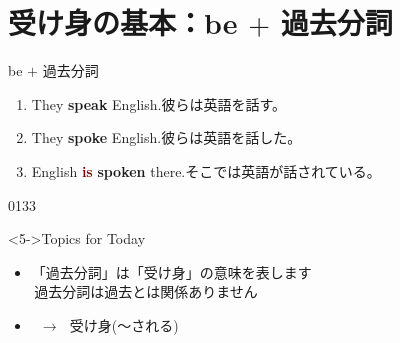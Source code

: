 \documentclass[aspectratio=169,xcolor={dvipsnames,table}]{beamer}
\newcommand{\myaudio}[1]{\href{#1}{\faVolumeUp}}
\begin{document}
\section{受け身の基本：be $+$ 過去分詞}
\begin{frame}[plain]{be $+$ 過去分詞}
 \large
\begin{enumerate}
 \item<1-> They \textbf{speak} English.\hfill{}{\scriptsize 彼らは英語を話す。}
 \item<2-> They \textbf{spoke} English.\hfill{\scriptsize 彼らは英語を話した。}
 \item<3-> English \textcolor{Maroon}{\bfseries is} \textcolor{NavyBlue}{\bfseries spoken} there.\hfill{\scriptsize そこでは英語が話されている。}
\end{enumerate}

\begin{center}
 
\end{center}


\hfill{\tiny 0133}\,{\scriptsize \myaudio{./audio/051_passive_01.mp3}}
\begin{block}<5->{Topics for Today}
\begin{itemize}[square]\small
 \item 「過去分詞」は「受け身」の意味を表します\\
\hfill{\textdbend\,過去分詞は過去とは関係ありません}\scalebox{2}{😭}
 \item {}\, $\longrightarrow$\,\,\,\,受け身(〜される)
\end{itemize}
     \end{block}
\end{frame}
\end{document}
